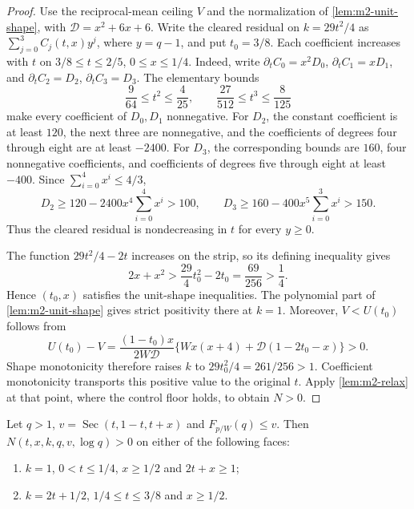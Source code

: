 \begin{proof}
Use the reciprocal-mean ceiling $V$ and the normalization of \cref{lem:m2-unit-shape},
with $\mathcal D=x^2+6x+6$.
Write the cleared residual on $k=29t^2/4$ as $\sum_{j=0}^3C_j(t,x)y^j$, where $y=q-1$,
and put $t_0=3/8$.
Each coefficient increases with $t$ on $3/8\le t\le2/5$, $0\le x\le1/4$.
Indeed, write $\partial_tC_0=x^2D_0$, $\partial_tC_1=xD_1$, and
$\partial_tC_2=D_2$, $\partial_tC_3=D_3$.
The elementary bounds
\[
 \frac9{64}\le t^2\le\frac4{25},\qquad
 \frac{27}{512}\le t^3\le\frac8{125}
\]
make every coefficient of $D_0,D_1$ nonnegative.
For $D_2$, the constant coefficient is at least $120$, the next three are nonnegative,
and the coefficients of degrees four through eight are at least $-2400$.
For $D_3$, the corresponding bounds are $160$, four nonnegative coefficients,
and coefficients of degrees five through eight at least $-400$.
Since $\sum_{i=0}^4x^i\le4/3$,
\[
 D_2\ge120-2400x^4\sum_{i=0}^4x^i>100,\qquad
 D_3\ge160-400x^5\sum_{i=0}^3x^i>150.
\]
Thus the cleared residual is nondecreasing in $t$ for every $y\ge0$.

The function $29t^2/4-2t$ increases on the strip, so its defining inequality gives
\[
 2x+x^2>\frac{29}4t_0^2-2t_0=\frac{69}{256}>\frac14.
\]
Hence $(t_0,x)$ satisfies the unit-shape inequalities.
The polynomial part of \cref{lem:m2-unit-shape} gives strict positivity there at $k=1$.
Moreover, $V<U(t_0)$ follows from
\[
 U(t_0)-V=\frac{(1-t_0)x}{2W\mathcal D}
 \{Wx(x+4)+\mathcal D(1-2t_0-x)\}>0.
\]
Shape monotonicity therefore raises $k$ to $29t_0^2/4=261/256>1$.
Coefficient monotonicity transports this positive value to the original $t$.
Apply \cref{lem:m2-relax} at that point, where the control floor holds, to obtain $N>0$.
\end{proof}

\begin{lemma}\label{lem:m2-low-unit}
Let $q>1$, $v=\operatorname{Sec}(t,1-t,t+x)$ and $F_{p/W}(q)\le v$.
Then $N(t,x,k,q,v,\log q)>0$ on either of the following faces:
\begin{enumerate}
\item $k=1$, $0<t\le1/4$, $x\ge1/2$ and $2t+x\ge1$;
\item $k=2t+1/2$, $1/4\le t\le3/8$ and $x\ge1/2$.
\end{enumerate}
\end{lemma}

